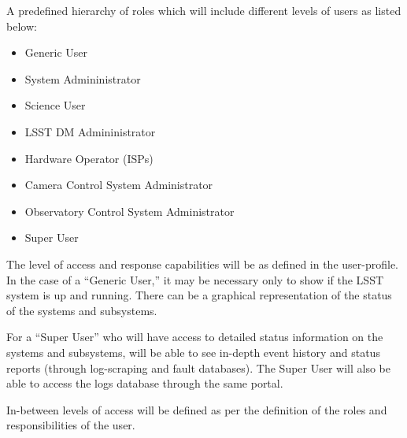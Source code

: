 A predefined hierarchy of roles which will include different levels of users as 
listed below:

\begin{itemize}

\item Generic User
\item System Admininistrator
\item Science User
\item LSST DM Admininistrator
\item Hardware Operator (ISPs)
\item Camera Control System Administrator
\item Observatory Control System Administrator
\item Super User

\end{itemize}

The level of access and response capabilities will be as defined in the 
user-profile. In the case of a ``Generic User,'' it may be necessary only to show 
if the LSST system is up and running. There can be a graphical representation of 
the status of the systems and subsystems. 

For a ``Super User'' who will have access to detailed status information on the 
systems and subsystems, will be able to see in-depth event history and status 
reports (through log-scraping and fault databases). The Super User will also be 
able to access the logs database through the same portal.

In-between levels of access will be defined as per the definition of the roles 
and responsibilities of the user.
